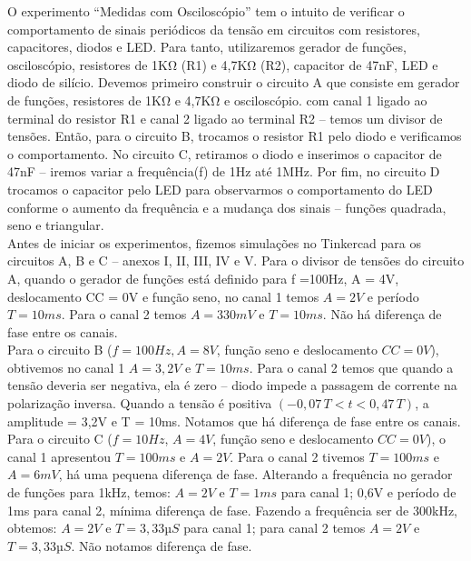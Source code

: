 \documentclass[a4paper, 11pt]{article}
\begin{document}

O experimento “Medidas com Osciloscópio” tem o intuito de verificar o comportamento de sinais periódicos da tensão em circuitos com resistores, capacitores, diodos e LED. Para tanto, utilizaremos gerador de funções, osciloscópio, resistores de 1KΩ (R1) e 4,7KΩ (R2), capacitor de 47nF, LED e diodo de silício. Devemos primeiro construir o circuito A que consiste em gerador de funções, resistores de 1KΩ e 4,7KΩ e osciloscópio. com canal 1 ligado ao terminal do resistor R1 e canal 2 ligado ao terminal R2 – temos um divisor de tensões. Então, para o circuito B, trocamos o resistor R1 pelo diodo e verificamos o comportamento. No circuito C, retiramos o diodo e inserimos o capacitor de 47nF – iremos variar a frequência(f) de 1Hz até 1MHz. Por fim, no circuito D trocamos o capacitor pelo LED para observarmos o comportamento do LED conforme o aumento da frequência e a mudança dos sinais – funções quadrada, seno e triangular.\\

Antes de iniciar os experimentos, fizemos simulações no Tinkercad para os circuitos A, B e C – anexos I, II, III, IV e V. Para o divisor de tensões do circuito A, quando o gerador de funções está definido para f =100Hz, A = 4V, deslocamento CC = 0V e função seno, no canal 1 temos $A = 2V$ e período $T = 10ms$. Para o canal 2 temos $A = 330mV$ e $T = 10ms$. Não há diferença de fase entre os canais.\\

Para o circuito B ($f = 100Hz, A = 8V$, função seno e deslocamento $CC = 0V$), obtivemos no canal 1 $A = 3,2V$ e  $T = 10ms$. Para o canal 2 temos que quando a tensão deveria ser negativa, ela é zero – diodo impede a passagem de corrente na polarização inversa. Quando a tensão é positiva $(-0,07 \, T < t < 0,47 \, T)$, a amplitude = 3,2V e T = 10ms. Notamos que há diferença de fase entre os canais.\\

Para o circuito C ($f = 10Hz$, $A = 4V$, função seno e deslocamento $CC = 0V$), o canal 1 apresentou $T = 100ms$ e $A = 2V$. Para o canal 2 tivemos $T = 100ms$ e $A = 6mV$, há uma pequena diferença de fase. Alterando a frequência no gerador de funções para 1kHz, temos: $A = 2V$ e $T = 1ms$ para canal 1; 0,6V e período de 1ms para canal 2, mínima diferença de fase. Fazendo a frequência ser de 300kHz, obtemos: $A = 2V$ e $T = 3,33µS$ para canal 1; para canal 2 temos $A = 2V$ e $T = 3,33µS$. Não notamos diferença de fase.\\
\end{document}
